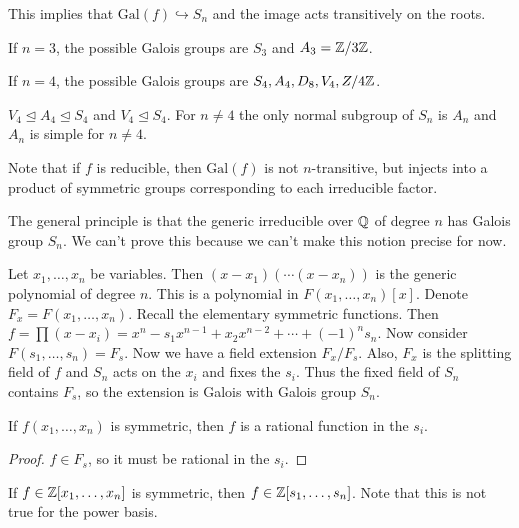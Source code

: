 \documentclass[10pt, twoside]{article}
\begin{document}
        This implies that $\mathrm{Gal}(f) \hookrightarrow S_n$ and the image acts transitively on the roots.

        \begin{exm}
            If $n=3$, the possible Galois groups are $S_3$ and $A_3 = \mathbb{Z}/3\mathbb{Z}$.

            If $n=4$, the possible Galois groups are $S_4, A_4, D_8, V_4, Z/4\mathbb{Z}$.
        \end{exm}

        \begin{rmk}
            $V_4 \trianglelefteq A_4 \trianglelefteq S_4$ and $V_4 \trianglelefteq S_4$. For $n \neq 4$ the only normal subgroup of $S_n$ is $A_n$ and $A_n$ is simple for $n \neq 4$.
        \end{rmk}

        Note that if $f$ is reducible, then $\mathrm{Gal}(f)$ is not $n$-transitive, but injects into a product of symmetric groups corresponding to each irreducible factor.

        The general principle is that the generic irreducible over $\mathbb{Q}$ of degree $n$ has Galois group $S_n$. We can't prove this because we can't make this notion precise for now.

        Let $x_1, \ldots, x_n$ be variables. Then $(x-x_1)(\cdots (x-x_n))$ is the generic polynomial of degree $n$. This is a polynomial in $F(x_1, \ldots, x_n)[x]$. Denote $F_x = F(x_1, \ldots, x_n)$. Recall the elementary symmetric functions. Then $f = \prod (x-x_i) = x^n - s_1 x^{n-1} + x_2x^{n-2} + \cdots + (-1)^n s_n$. Now consider $F(s_1, \ldots, s_n) = F_s$. Now we have a field extension $F_x/F_s$. Also, $F_x$ is the splitting field of $f$ and $S_n$ acts on the $x_i$ and fixes the $s_i$. Thus the fixed field of $S_n$ contains $F_s$, so the extension is Galois with Galois group $S_n$.

        \begin{cor}
            If $f(x_1, \ldots, x_n)$ is symmetric, then $f$ is a rational function in the $s_i$.
            \begin{proof}
                $f \in F_s$, so it must be rational in the $s_i$.
            \end{proof}
        \end{cor}

        \begin{rmk}
            If $f \in \mathbb{Z}[x_1, \ldots, x_n]$ is symmetric, then $f \in \mathbb{Z}[s_1, \ldots, s_n]$. Note that this is not true for the power basis.
        \end{rmk}
\end{document}
